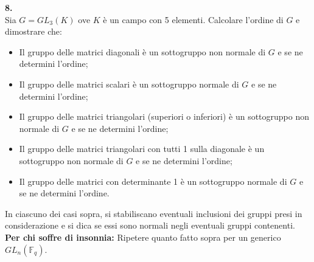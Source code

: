 \documentclass[italian,a4paper,11pt]
{article}
\newcommand{\acc}{\`}
\begin{document}
\vspace{0.4cm}
\noindent
\begin{Ex}\textbf{ 8.}\\
Sia $G=GL_3(K)$ ove $K$ \acc e un campo con 5 elementi. Calcolare l'ordine di $G$ e dimostrare che:
\begin{itemize}
\item Il gruppo delle matrici diagonali \acc e un sottogruppo non normale di $G$ e se ne determini l'ordine;

\item Il gruppo delle matrici scalari \acc e un sottogruppo
normale di $G$ e se ne determini l'ordine;

\item Il gruppo delle matrici triangolari (superiori o inferiori) \acc e un sottogruppo non normale di $G$ e se ne determini l'ordine;

\item Il gruppo delle matrici triangolari con tutti 1 sulla
diagonale \acc e un sottogruppo non normale di $G$ e se ne determini l'ordine;

\item Il gruppo delle matrici con determinante 1 \acc e un sottogruppo
normale di $G$ e se ne determini l'ordine.
\end{itemize}
In ciascuno dei casi sopra, si stabiliscano eventuali inclusioni dei gruppi
presi in considerazione e si dica se essi sono normali negli eventuali gruppi
contenenti.
\\
\textbf{Per chi soffre di insonnia:} Ripetere quanto fatto sopra per un generico $GL_n(\mathbb{F}_q)$.
\end{Ex}
\end{document}
